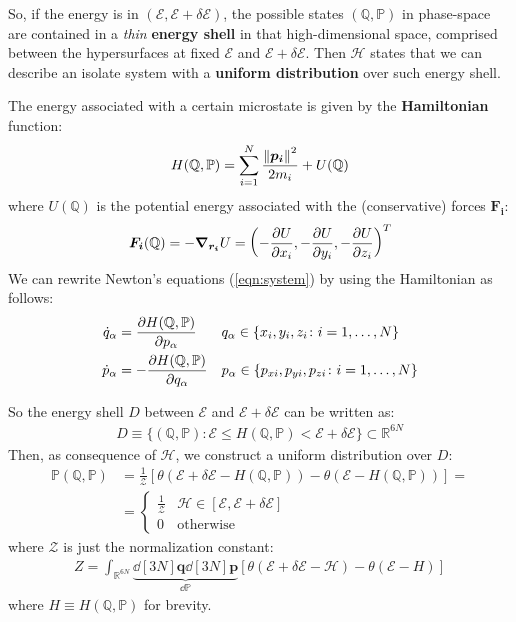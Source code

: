 \documentclass[../template.tex]{subfiles}
\begin{document}
\medskip

So, if the energy is in $(\mathcal{E}, \mathcal{E}+ \delta \mathcal{E})$, the possible states $(\mathbb{Q},\mathbb{P})$ in phase-space are contained in a \textit{thin} \textbf{energy shell} in that high-dimensional space, comprised between the hypersurfaces at fixed $\mathcal{E}$ and $\mathcal{E}+ \delta \mathcal{E}$. Then $\mathcal{H}$ states that we can describe an isolate system with a \textbf{uniform distribution} over such energy shell. 


\medskip

The energy associated with a certain microstate is given by the \textbf{Hamiltonian}  function:
\begin{align*}
    H(\mathbb{Q},\mathbb{P}) = \sum_{i=1}^N \frac{\norm{\bm{p_i}}^2}{2m_i} + U(\mathbb{\mathbb{Q}}) 
\end{align*}
where $U(\mathbb{Q})$ is the potential energy associated with the (conservative) forces $\bm{F_i}$:
\begin{align*}
    \bm{F_i}(\mathbb{Q}) = - \grad_{\bm{r_i}} U = \left(-\pdv{U}{x_i}, - \pdv{U}{y_i}, -\pdv{U}{z_i}\right)^T
\end{align*}
We can rewrite Newton's equations (\ref{eqn:system}) by using the Hamiltonian as follows:
\begin{align*}
    \dot{q}_\alpha &=  \pdv{H(\mathbb{Q},\mathbb{P})}{p_\alpha} && q_\alpha \in \{x_i, y_i, z_i \colon i=1, \dots, N\}\\
    \dot{p}_\alpha &= -\pdv{H(\mathbb{Q},\mathbb{P})}{q_\alpha}
    && p_\alpha \in \{p_{xi}, p_{yi}, p_{zi} \colon i = 1, \dots, N\}
\end{align*}

So the energy shell $D$ between $\mathcal{E}$ and $\mathcal{E}+ \delta \mathcal{E}$ can be written as:
\begin{align*}
    D \equiv \{(\mathbb{Q},\mathbb{P}) \colon \mathcal{E} \leq H(\mathbb{Q}, \mathbb{P}) < \mathcal{E}+ \delta \mathcal{E}\} \subset \mathbb{R}^{6N}
\end{align*}
Then, as consequence of $\mathcal{H}$, we construct a uniform distribution over $D$:
\begin{align*}
    \mathbb{P}(\mathbb{Q},\mathbb{P}) &= \frac{1}{\mathcal{Z}} [\theta(\mathcal{E}+ \delta \mathcal{E} - H(\mathbb{Q},\mathbb{P})) - \theta(\mathcal{E}-H(\mathbb{Q},\mathbb{P}))] =\\
    &= \begin{cases}
        \frac{1}{\mathcal{Z}} & \mathcal{H}\in [\mathcal{E}, \mathcal{E}+\delta \mathcal{E}]\\
        0 & \text{otherwise} 
    \end{cases}
\end{align*}
where $\mathcal{Z}$ is just the normalization constant:
\begin{align}\label{eqn:Z-def}
    Z = \int_{\mathbb{R}^{6N}} \underbrace{\dd[3N]{\bm{q}}\dd[3N]{\bm{p}}}_{\dd{\mathbb{P}}} [\theta(\mathcal{E}+\delta \mathcal{E-H}) - \theta(\mathcal{E}-H)]
\end{align}
where $H\equiv H(\mathbb{Q},\mathbb{P})$ for brevity.
\end{document}
